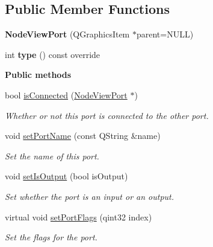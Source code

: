 \subsection*{Public Member Functions}
\begin{DoxyCompactItemize}
\item 
\mbox{\label{classrev_1_1_view_1_1_node_view_port_ac6f5acc3aae0f54893e8a4e5fedeb899}} 
{\bfseries Node\+View\+Port} (Q\+Graphics\+Item $\ast$parent=N\+U\+LL)
\item 
\mbox{\label{classrev_1_1_view_1_1_node_view_port_adc0f5e266eca88f297f2a91f6a78138e}} 
int {\bfseries type} () const override
\end{DoxyCompactItemize}
\begin{Indent}\textbf{ Public methods}\par
\begin{DoxyCompactItemize}
\item 
\mbox{\label{classrev_1_1_view_1_1_node_view_port_acb7afa44da91d2a93d71cb92cf1dbc9f}} 
bool \mbox{\hyperlink{classrev_1_1_view_1_1_node_view_port_acb7afa44da91d2a93d71cb92cf1dbc9f}{is\+Connected}} (\mbox{\hyperlink{classrev_1_1_view_1_1_node_view_port}{Node\+View\+Port}} $\ast$)
\begin{DoxyCompactList}\small\item\em Whether or not this port is connected to the other port. \end{DoxyCompactList}\item 
\mbox{\label{classrev_1_1_view_1_1_node_view_port_a7e440da1051d7431cf51f7a306af870d}} 
void \mbox{\hyperlink{classrev_1_1_view_1_1_node_view_port_a7e440da1051d7431cf51f7a306af870d}{set\+Port\+Name}} (const Q\+String \&name)
\begin{DoxyCompactList}\small\item\em Set the name of this port. \end{DoxyCompactList}\item 
\mbox{\label{classrev_1_1_view_1_1_node_view_port_a7c9cffd4cefc29032b7130d62bc77c2e}} 
void \mbox{\hyperlink{classrev_1_1_view_1_1_node_view_port_a7c9cffd4cefc29032b7130d62bc77c2e}{set\+Is\+Output}} (bool is\+Output)
\begin{DoxyCompactList}\small\item\em Set whether the port is an input or an output. \end{DoxyCompactList}\item 
virtual void \mbox{\hyperlink{classrev_1_1_view_1_1_node_view_port_a2d80923d0c891ffa3a233d3e008dc289}{set\+Port\+Flags}} (qint32 index)
\begin{DoxyCompactList}\small\item\em Set the flags for the port. \end{DoxyCompactList}\end{DoxyCompactItemize}
\end{Indent}
